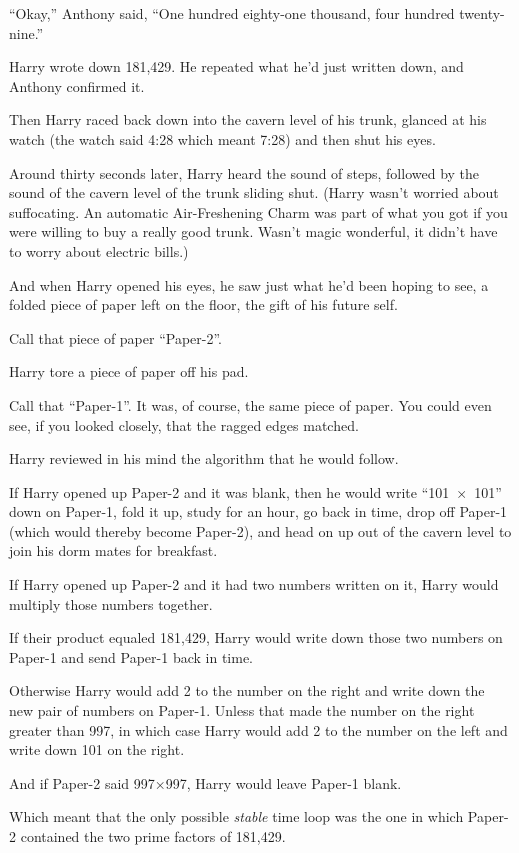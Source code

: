 “Okay,” Anthony said, “One hundred eighty-one thousand, four hundred twenty-nine.”

Harry wrote down 181,429. He repeated what he’d just written down, and Anthony confirmed it.

Then Harry raced back down into the cavern level of his trunk, glanced at his watch (the watch said 4:28 which meant 7:28) and then shut his eyes.

Around thirty seconds later, Harry heard the sound of steps, followed by the sound of the cavern level of the trunk sliding shut. (Harry wasn’t worried about suffocating. An automatic Air-Freshening Charm was part of what you got if you were willing to buy a really good trunk. Wasn’t magic wonderful, it didn’t have to worry about electric bills.)

And when Harry opened his eyes, he saw just what he’d been hoping to see, a folded piece of paper left on the floor, the gift of his future self.

Call that piece of paper “Paper-2”.

Harry tore a piece of paper off his pad.

Call that “Paper-1”. It was, of course, the same piece of paper. You could even see, if you looked closely, that the ragged edges matched.

Harry reviewed in his mind the algorithm that he would follow.

If Harry opened up Paper-2 and it was blank, then he would write “101~×~101” down on Paper-1, fold it up, study for an hour, go back in time, drop off Paper-1 (which would thereby become Paper-2), and head on up out of the cavern level to join his dorm mates for breakfast.

If Harry opened up Paper-2 and it had two numbers written on it, Harry would multiply those numbers together.

If their product equaled 181,429, Harry would write down those two numbers on Paper-1 and send Paper-1 back in time.

Otherwise Harry would add 2 to the number on the right and write down the new pair of numbers on Paper-1. Unless that made the number on the right greater than 997, in which case Harry would add 2 to the number on the left and write down 101 on the right.

And if Paper-2 said 997×997, Harry would leave Paper-1 blank.

Which meant that the only possible \emph{stable} time loop was the one in which Paper-2 contained the two prime factors of 181,429.

